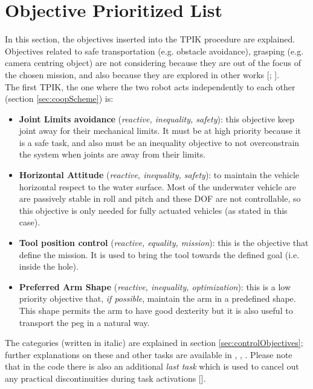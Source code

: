 \section{Objective Prioritized List}
In this section, the objectives inserted into the TPIK procedure are explained.\\ Objectives related to safe transportation (e.g. obstacle avoidance), grasping (e.g. camera centring object) are not considering because they are out of the focus of the chosen mission, and also because they are explored in other works [\cite{IntroMaris2}; \cite{IntroRecent}].\\

The first TPIK, the one where the two robot acts independently to each other (section \ref{sec:coopScheme}) is:
\begin{itemize}
	\item \textbf{Joint Limits avoidance} (\textit{reactive, inequality, safety}): this objective keep joint away for their mechanical limits. It must be at high priority because it is a safe task, and also must be an inequality objective to not overconstrain the system when joints are away from their limits.
	
	\item \textbf{Horizontal Attitude} (\textit{reactive, inequality, safety}): to maintain the vehicle horizontal respect to the water surface. Most of the underwater vehicle are are passively stable in roll and pitch and these DOF are not controllable, so this objective is only needed for fully actuated vehicles (as stated in this case).
	
	\item \textbf{Tool position control} (\textit{reactive, equality, mission}): this is the objective that define the mission. It is used to bring the tool towards the defined goal (i.e. inside the hole).
	
	\item \textbf{Preferred Arm Shape} (\textit{reactive, inequality, optimization}): this is a low priority objective that, \textit{if possible}, maintain the arm in a predefined shape. This shape permits the arm to have good dexterity but it is also useful to transport the peg in a natural way.
	
	
\end{itemize}
The categories (written in italic) are explained in section \ref{sec:controlObjectives}; further explanations on these and other tasks are available in \cite{IntroMaris2}, \cite{tesiWander}, \cite{IntroRecent}. Please note that in the code there is also an additional \textit{last task} which is used to cancel out any practical discontinuities during task activations [\cite{IntroMaris1}].\\

